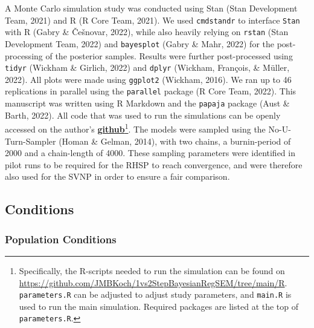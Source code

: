 \documentclass[
  man, donotrepeattitle,floatsintext]{apa6}
\begin{document}
A Monte Carlo simulation study was conducted using Stan
(Stan Development Team, 2021) and R (R Core Team, 2021). We used
\texttt{cmdstandr} to interface \texttt{Stan} with R (Gabry \& Češnovar, 2022), while also
heavily relying on \texttt{rstan} (Stan Development Team, 2022) and
\texttt{bayesplot} (Gabry \& Mahr, 2022) for the post-processing of the
posterior samples. Results were further post-processed using \texttt{tidyr}
(Wickham \& Girlich, 2022) and \texttt{dplyr} (Wickham, François, \& Müller, 2022). All plots were
made using \texttt{ggplot2} (Wickham, 2016). We ran up to 46
replications in parallel using the \texttt{parallel} package
(R Core Team, 2022). This manuscript was written using R
Markdown and the \texttt{papaja} package (Aust \& Barth, 2022). All code that was
used to run the simulations can be openly accessed on the author's
\href{https://github.com/JMBKoch/1vs2StepBayesianRegSEM}{\textbf{github}}\footnote{Specifically, the R-scripts needed to run the simulation can be
  found on
  \url{https://github.com/JMBKoch/1vs2StepBayesianRegSEM/tree/main/R}.
  \texttt{parameters.R} can be adjusted to adjust study parameters, and
  \texttt{main.R} is used to run the main simulation. Required packages are
  listed at the top of \texttt{parameters.R}.}. The
models were sampled using the No-U-Turn-Sampler (Homan \& Gelman, 2014),
with two chains, a burnin-period of 2000 and a chain-length of 4000.
These sampling parameters were identified in pilot runs to be required
for the RHSP to reach convergence, and were therefore also used for the
SVNP in order to ensure a fair comparison.

\subsection{Conditions}\label{conditions}

\subsubsection{Population Conditions}\label{population-conditions}
\end{document}
